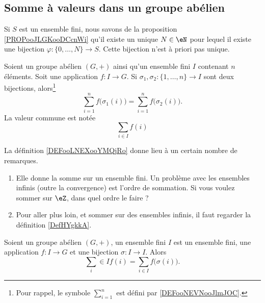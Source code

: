 \subsection{Somme à valeurs dans un groupe abélien}

Si \( S\) est un ensemble fini, nous savons de la proposition \ref{PROPooJLGKooDCcnWi} qu'il existe un unique \( N\in \eN\) pour lequel il existe une bijection \( \varphi\colon \{ 0,\ldots, N \}\to S\). Cette bijection n'est à priori pas unique.

\begin{lemmaDef}       \label{DEFooLNEXooYMQjRo}
    Soient un groupe abélien \( (G,+)\) ainsi qu'un ensemble fini \( I\) contenant \( n\) éléments. Soit une application \( f\colon I\to G \). Si \( \sigma_1,\sigma_2\colon \{1,\ldots, n \}\to I\) sont deux bijections, alors\footnote{Pour rappel, le symbole \( \sum_{i=1}^n\) est défini par \ref{DEFooNEVNooJlmJOC}.}
    \begin{equation}
        \sum_{i=1}^nf\big( \sigma_1(i) \big)=\sum_{i=1}^nf\big( \sigma_2(i) \big).
    \end{equation}
    La valeur commune est notée
    \begin{equation}
        \sum_{i\in I}f(i)
    \end{equation}
\end{lemmaDef}

La définition \ref{DEFooLNEXooYMQjRo} donne lieu à un certain nombre de remarques.
\begin{enumerate}
    \item
        Elle donne la somme sur un ensemble fini. Un problème avec les ensembles infinis (outre la convergence) est l'ordre de sommation. Si vous voulez sommer sur \( \eZ\), dans quel ordre le faire ?
    \item
        Pour aller plus loin, et sommer sur des ensembles infinis, il faut regarder la définition \ref{DefHYgkkA}. 
\end{enumerate}

\begin{proposition}     \label{PROPooJBQVooNqWErk}
    Soient un groupe abélien \( (G,+)\), un ensemble fini \( I\) est un ensemble fini, une application \( f\colon I\to G\) et une bijection \( \sigma\colon I\to I\). Alors
    \begin{equation}
        \sum_i\in If(i)=\sum_{i\in I}f\big( \sigma(i) \big).
    \end{equation}
\end{proposition}

